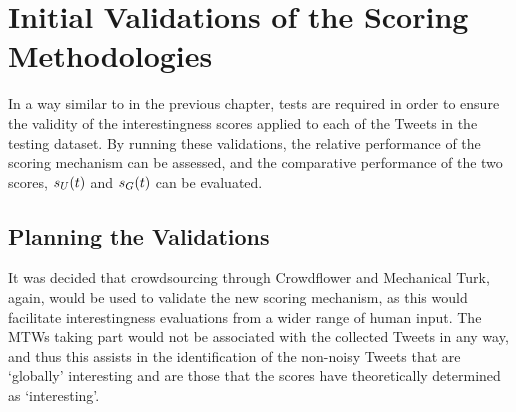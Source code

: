 %
%



\section{Initial Validations of the Scoring Methodologies}
In a way similar to in the previous chapter, tests are required in order to ensure the validity of the interestingness scores applied to each of the Tweets in the testing dataset. By running these validations, the relative performance of the scoring mechanism can be assessed, and the comparative performance of the two scores, $s_U(t)$ and $s_G(t)$ can be evaluated.


\subsection{Planning the Validations}
It was decided that crowdsourcing through Crowdflower and Mechanical Turk, again, would be used to validate the new scoring mechanism, as this would facilitate interestingness evaluations from a wider range of human input. The MTWs taking part would not be associated with the collected Tweets in any way, and thus this assists in the identification of the non-noisy Tweets that are `globally' interesting and are those that the scores have theoretically determined as `interesting'.

